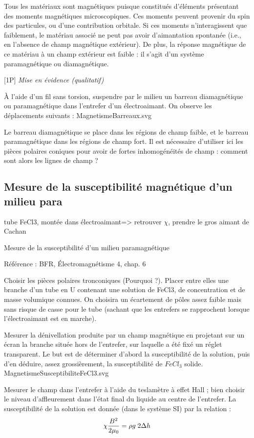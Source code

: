 \documentclass{article}%
\begin{document}
Tous les matériaux sont magnétiques puisque constitués d'éléments présentant des moments magnétiques microscopiques. Ces moments peuvent provenir du spin des particules, ou d'une contribution orbitale. Si ces moments n'interagissent que faiblement, le matériau associé ne peut pas avoir d'aimantation spontanée (i.e., en l'absence de champ magnétique extérieur). De plus, la réponse magnétique de ce matériau à un champ extérieur est faible : il s'agit d'un système paramagnétique ou diamagnétique.

[1P] \textit{Mise en évidence (qualitatif)}

À l'aide d'un fil sans torsion, suspendre par le milieu un barreau diamagnétique ou paramagnétique dans l'entrefer d'un électroaimant. On observe les déplacements suivants :
MagnetismeBarreaux.svg

Le barreau diamagnétique se place dans les régions de champ faible, et le barreau paramagnétique dans les régions de champ fort. Il est nécessaire d'utiliser ici les pièces polaires coniques pour avoir de fortes inhomogénéités de champ : comment sont alors les lignes de champ ? 

\subsection{Mesure de la susceptibilité magnétique d'un milieu para}
tube FeCl3, montée dans électroaimant=> retrouver $\chi$, prendre le gros aimant de Cachan

Mesure de la susceptibilité d'un milieu paramagnétique

Référence : BFR, Électromagnétisme 4, chap. 6

Choisir les pièces polaires tronconiques (Pourquoi ?). Placer entre elles une branche d'un tube en U contenant une solution de FeCl3, de concentration et de masse volumique connues. On choisira un écartement de pôles assez faible mais sans risque de casse pour le tube (sachant que les entrefers se rapprochent lorsque l'électroaimant est en marche).

Mesurer la dénivellation produite par un champ magnétique en projetant sur un écran la branche située hors de l'entrefer, sur laquelle a été fixé un réglet transparent. Le but est de déterminer d'abord la susceptibilité de la solution, puis d'en déduire, assez grossièrement, la susceptibilité de $FeCl_3$ solide.
MagnetismeSusceptibiliteFeCl3.svg

Mesurer le champ dans l'entrefer à l'aide du teslamètre à effet Hall ; bien choisir le niveau d'affleurement dans l'état final du liquide au centre de l'entrefer. La susceptibilité de la solution est donnée (dans le système SI) par la relation :
\[ \chi {B^2\over 2\mu_0} = \rho g\; 2 \Delta h\]
\end{document}
